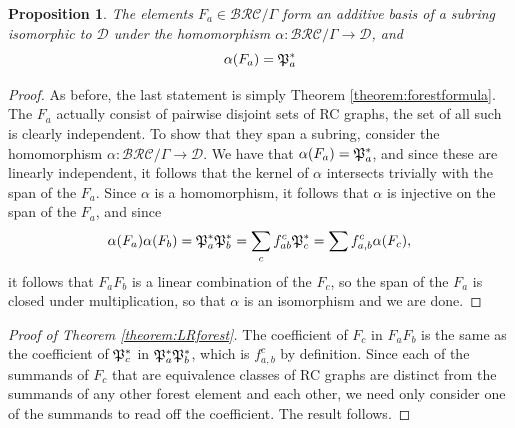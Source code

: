 \documentclass{amsart}
\newtheorem{proposition}[lemma]{Proposition}
\theoremstyle{definition}
\theoremstyle{remark}
\numberwithin{equation}{subsection}
\newcommand{\BRC}{\mathcal{BRC}}
\newcommand{\dcoma}{\mathcal{D}}
\begin{document}
\begin{proposition}
The elements $F_a\in\BRC/\Gamma$ form an additive basis of a subring isomorphic to $\dcoma$ under the homomorphism $\alpha:\BRC/\Gamma\to \dcoma$, and 
$$\alpha(F_a) = \mathfrak{P}_a^*$$
\end{proposition}
\begin{proof}
As before, the last statement is simply Theorem \ref{theorem:forestformula}. The $F_a$ actually consist of pairwise disjoint sets of RC graphs, the set of all such is clearly independent. To show that they span a subring, consider the homomorphism $\alpha:\BRC/\Gamma\to \dcoma$. We have that $\alpha(F_a)=\mathfrak{P}_a^*$, and since these are linearly independent, it follows that the kernel of $\alpha$ intersects trivially with the span of the $F_a$. Since $\alpha$ is a homomorphism, it follows that $\alpha$ is injective on the span of the $F_a$, and since 
$$\alpha(F_a)\alpha(F_b) = \mathfrak{P}_a^*\mathfrak{P}_b^*=\sum_{c}f_{ab}^c\mathfrak{P}_c^*=\sum f_{a,b}^c\alpha(F_c),$$ 
it follows that $F_aF_b$ is a linear combination of the $F_c$, so the span of the $F_a$ is closed under multiplication, so that $\alpha$ is an isomorphism and we are done.
\end{proof}

\begin{proof}[Proof of Theorem \ref{theorem:LRforest}]
  The coefficient of $F_c$ in $F_aF_b$ is the same as the coefficient of $\mathfrak{P}_c^*$ in $\mathfrak{P}_a^*\mathfrak{P}_b^*$, which is $f_{a,b}^c$ by definition. Since each of the summands of $F_c$ that are equivalence classes of RC graphs are distinct from the summands of any other forest element and each other, we need only consider one of the summands to read off the coefficient. The result follows.
\end{proof}
\end{document}
